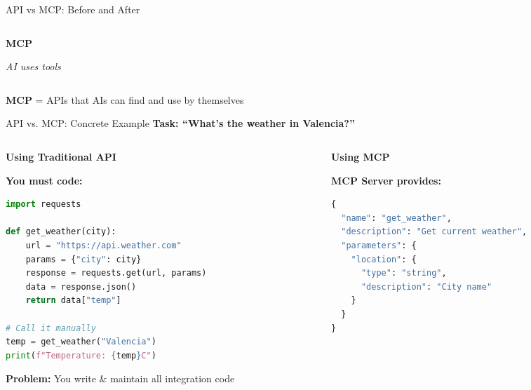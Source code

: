 \documentclass[aspectratio=169]{beamer}
\begin{document}
\begin{frame}{API vs MCP: Before and After}
\begin{columns}[T]
\begin{column}{0.48\textwidth}
      \vspace{0.5cm}
      \textbf{MCP}

      \small
      \textit{AI uses tools}
    \end{column}
  \end{columns}

  \vspace{0.5cm}
  \centering
  \normalsize
  \textbf{MCP} = APIs that AIs can find and use by themselves
\end{frame}

\begin{frame}[fragile]{API vs. MCP: Concrete Example}
  \centering
  \large\bfseries
  Task: ``What's the weather in Valencia?''

  \vspace{0.5cm}

  \begin{columns}[T]
    \begin{column}{0.48\textwidth}
      \centering
      \large\bfseries
      \textcolor{conesaOrange}{Using Traditional API}

      \vspace{0.5cm}
      \normalsize

      \textbf{You must code:}
      \begin{lstlisting}[language=python, basicstyle=\tiny\ttfamily]
import requests

def get_weather(city):
    url = "https://api.weather.com"
    params = {"city": city}
    response = requests.get(url, params)
    data = response.json()
    return data["temp"]

# Call it manually
temp = get_weather("Valencia")
print(f"Temperature: {temp}C")
      \end{lstlisting}

      \vspace{0.2cm}
      \textbf{Problem:} You write \& maintain all integration code
    \end{column}
    \begin{column}{0.48\textwidth}
      \centering
      \large\bfseries
      \textcolor{conesaTeal}{Using MCP}

      \vspace{0.5cm}
      \normalsize

      \textbf{MCP Server provides:}
      \begin{lstlisting}[language=python, basicstyle=\tiny\ttfamily]
{
  "name": "get_weather",
  "description": "Get current weather",
  "parameters": {
    "location": {
      "type": "string",
      "description": "City name"
    }
  }
}
      \end{lstlisting}


\end{column}
\end{columns}
\end{frame}
\end{document}
